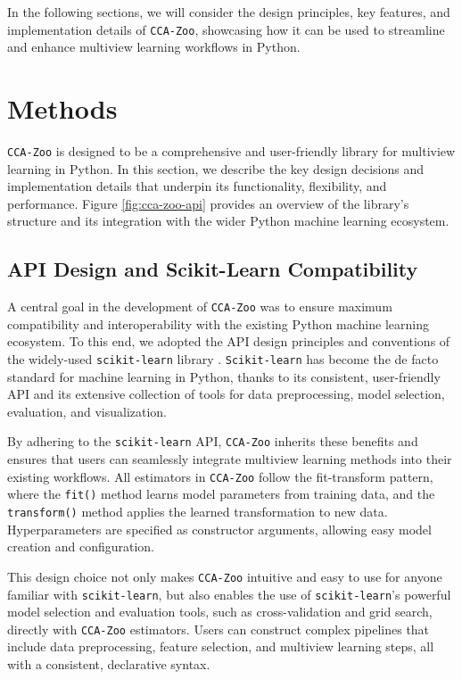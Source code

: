 In the following sections, we will consider the design principles, key features, and implementation details of \texttt{CCA-Zoo}, showcasing how it can be used to streamline and enhance multiview learning workflows in Python.

\section{Methods}

\texttt{CCA-Zoo} is designed to be a comprehensive and user-friendly library for multiview learning in Python. In this section, we describe the key design decisions and implementation details that underpin its functionality, flexibility, and performance. Figure \ref{fig:cca-zoo-api} provides an overview of the library's structure and its integration with the wider Python machine learning ecosystem.

\subsection{API Design and Scikit-Learn Compatibility}

A central goal in the development of \texttt{CCA-Zoo} was to ensure maximum compatibility and interoperability with the existing Python machine learning ecosystem. To this end, we adopted the API design principles and conventions of the widely-used \texttt{scikit-learn} library \citep{pedregosa2011scikit}. \texttt{Scikit-learn} has become the de facto standard for machine learning in Python, thanks to its consistent, user-friendly API and its extensive collection of tools for data preprocessing, model selection, evaluation, and visualization.

By adhering to the \texttt{scikit-learn} API, \texttt{CCA-Zoo} inherits these benefits and ensures that users can seamlessly integrate multiview learning methods into their existing workflows. All estimators in \texttt{CCA-Zoo} follow the fit-transform pattern, where the \texttt{fit()} method learns model parameters from training data, and the \texttt{transform()} method applies the learned transformation to new data. Hyperparameters are specified as constructor arguments, allowing easy model creation and configuration.

This design choice not only makes \texttt{CCA-Zoo} intuitive and easy to use for anyone familiar with \texttt{scikit-learn}, but also enables the use of \texttt{scikit-learn}'s powerful model selection and evaluation tools, such as cross-validation and grid search, directly with \texttt{CCA-Zoo} estimators. Users can construct complex pipelines that include data preprocessing, feature selection, and multiview learning steps, all with a consistent, declarative syntax.

